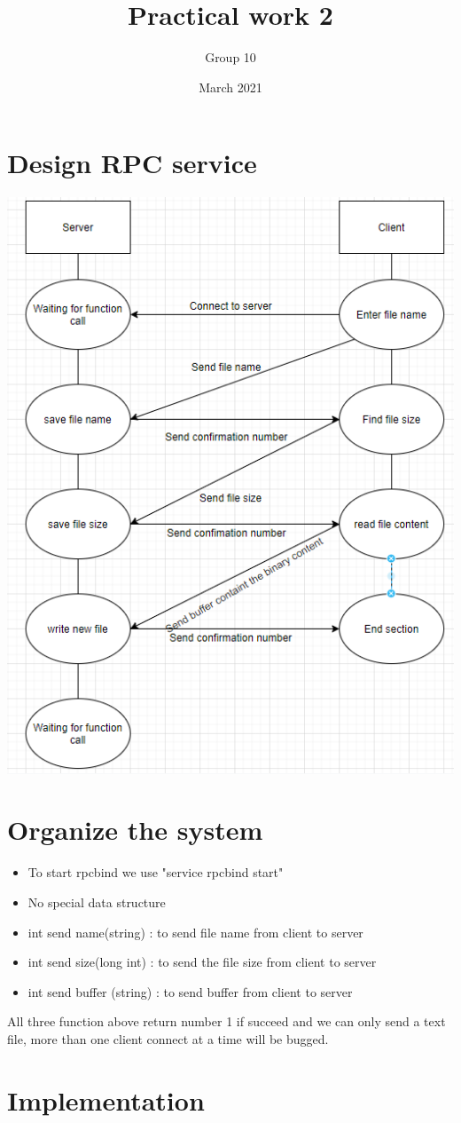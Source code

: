 \documentclass{article}
\title{Practical work 2}
\author{Group 10}
\date{March 2021}
\begin{document}
\maketitle
\section{Design RPC service}
\includegraphics[scale=0.35]{RPC.PNG}

\section{Organize the system}
\begin{itemize}
    \item To start rpcbind we use "service rpcbind start"
    \item No special data structure
    \item int send name(string) : to send file name from client to server
    \item int send size(long int) : to send the file size from client to server
    \item int send buffer (string) : to send buffer from client to server
\end{itemize}
All three function above return number 1 if succeed and we can only send a text file, more than one client connect at a time will be bugged.
\section{Implementation}
\end{document}
